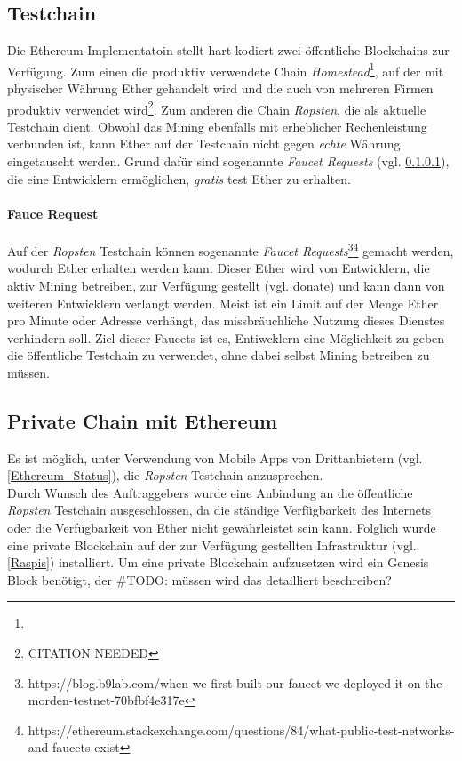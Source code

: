 \subsection{Testchain}
Die Ethereum Implementatoin stellt hart-kodiert zwei öffentliche Blockchains zur Verfügung. Zum einen die produktiv verwendete Chain \emph{Homestead}\footnote{}, auf der mit physischer Währung Ether gehandelt wird und die auch von mehreren Firmen produktiv verwendet wird\footnote{CITATION NEEDED}. Zum anderen die Chain \emph{Ropsten}, die als aktuelle Testchain dient. Obwohl das Mining ebenfalls mit erheblicher Rechenleistung verbunden ist, kann Ether auf der Testchain nicht gegen \emph{echte} Währung eingetauscht werden. Grund dafür sind sogenannte \emph{Faucet Requests} (vgl. \ref{para:Faucet_Request}), die eine Entwicklern ermöglichen, \emph{gratis} test Ether zu erhalten.

\paragraph{Fauce Request}
\label{para:Faucet_Request}
Auf der \emph{Ropsten} Testchain können sogenannte \emph{Faucet Requests}\footnote{https://blog.b9lab.com/when-we-first-built-our-faucet-we-deployed-it-on-the-morden-testnet-70bfbf4e317e}\footnote{https://ethereum.stackexchange.com/questions/84/what-public-test-networks-and-faucets-exist} gemacht werden, wodurch Ether erhalten werden kann. Dieser Ether wird von Entwicklern, die aktiv Mining betreiben, zur Verfügung gestellt (vgl. donate) und kann dann von weiteren Entwicklern verlangt werden. Meist ist ein Limit auf der Menge Ether pro Minute oder Adresse verhängt, das missbräuchliche Nutzung dieses Dienstes verhindern soll. Ziel dieser Faucets ist es, Entiwcklern eine Möglichkeit zu geben die öffentliche Testchain zu verwendet, ohne dabei selbst Mining betreiben zu müssen.

\subsection{Private Chain mit Ethereum}
Es ist möglich, unter Verwendung von Mobile Apps von Drittanbietern (vgl. \ref{Ethereum_Status}), die \emph{Ropsten} Testchain anzusprechen. 
\\Durch Wunsch des Auftraggebers wurde eine Anbindung an die öffentliche \emph{Ropsten} Testchain ausgeschlossen, da die ständige Verfügbarkeit des Internets oder die Verfügbarkeit von Ether nicht gewährleistet sein kann. Folglich wurde eine private Blockchain auf der zur Verfügung gestellten Infrastruktur (vgl.\ref{Raspis}) installiert. Um eine private Blockchain aufzusetzen wird ein Genesis Block benötigt, der \#TODO: müssen wird das detailliert beschreiben?

